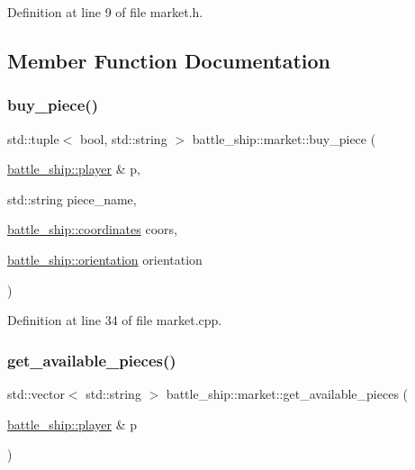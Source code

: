 Definition at line 9 of file market.\+h.



\subsection{Member Function Documentation}
\mbox{\label{classbattle__ship_1_1market_ab8bfb830477cdb9fc361a13306c14859}} 
\subsubsection{\texorpdfstring{buy\+\_\+piece()}{buy\_piece()}}
{\footnotesize\ttfamily std\+::tuple$<$ bool, std\+::string $>$ battle\+\_\+ship\+::market\+::buy\+\_\+piece (\begin{DoxyParamCaption}\item[{\hyperlink{classbattle__ship_1_1player}{battle\+\_\+ship\+::player} \&}]{p,  }\item[{std\+::string}]{piece\+\_\+name,  }\item[{\hyperlink{structbattle__ship_1_1coordinates}{battle\+\_\+ship\+::coordinates}}]{coors,  }\item[{\hyperlink{namespacebattle__ship_aed87488f0a73f0d0679fe343fb61c784}{battle\+\_\+ship\+::orientation}}]{orientation }\end{DoxyParamCaption})\hspace{0.3cm}{\ttfamily [static]}}



Definition at line 34 of file market.\+cpp.

\mbox{\label{classbattle__ship_1_1market_a0da0b4d6279e2b07a900eaf76d23c691}} 
\subsubsection{\texorpdfstring{get\+\_\+available\+\_\+pieces()}{get\_available\_pieces()}}
{\footnotesize\ttfamily std\+::vector$<$ std\+::string $>$ battle\+\_\+ship\+::market\+::get\+\_\+available\+\_\+pieces (\begin{DoxyParamCaption}\item[{\hyperlink{classbattle__ship_1_1player}{battle\+\_\+ship\+::player} \&}]{p }\end{DoxyParamCaption})\hspace{0.3cm}{\ttfamily [static]}}



